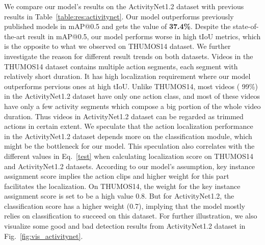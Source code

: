\documentclass[runningheads]{llncs}
\begin{document}
\smallskip
{}
We compare our model's results on the ActivityNet1.2 dataset with previous results in Table~\ref{table:res:activitynet}. Our model outperforms previously published models in mAP@0.5 and gets the value of \textbf{37.4\%}. Despite the state-of-the-art result in mAP@0.5, our model performs worse in high tIoU metrics, which is the opposite to what we observed on THUMOS14 dataset. 
We further investigate the reason for different result trends on both datasets. Videos in the THUMOS14 dataset contains multiple action segments, each segment with relatively short duration.
It has high localization requirement where our model outperforms pervious ones at high tIoU.
Unlike THUMOS14, most videos ( 99\%) in the ActivityNet1.2 dataset have only one action class, and most of these videos have only a few activity segments which compose a big portion of the whole video duration.
Thus videos in ActivityNet1.2 dataset can be regarded as trimmed actions in certain extent. We speculate that the action localization performance in the ActivityNet1.2 dataset depends more on the classification module, which might be the bottleneck for our model. This speculation also correlates with the different  values in Eq.~\ref{test} when calculating localization score on THUMOS14 and ActivityNet1.2 datasets. 
According to our model's assumption, key instance assignment score  implies the action clips and higher weight for this part facilitates the localization. On THUMOS14, the weight  for the key instance assignment score  is set to be a high value 0.8.
But for ActivityNet1.2, the classification score  has a higher weight (0.7), implying that the model mostly relies on classification to succeed on this dataset. 
For further illustration, we also visualize some good and bad detection results from ActivityNet1.2 dataset in Fig.~\ref{fig:vis_activitynet}.
\end{document}
